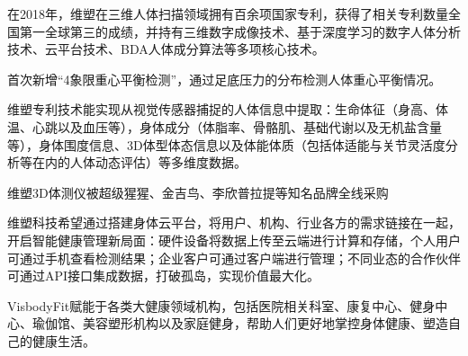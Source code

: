 \documentclass[letterpaper,11pt,english]{sphinxmanual}
\begin{document}
在2018年，维塑在三维人体扫描领域拥有百余项国家专利，获得了相关专利数量全国第一全球第三的成绩，并持有三维数字成像技术、基于深度学习的数字人体分析技术、云平台技术、BDA人体成分算法等多项核心技术。%
\begin{footnote}[691]\sphinxAtStartFootnote
{}
%
\end{footnote}

首次新增“4象限重心平衡检测”，通过足底压力的分布检测人体重心平衡情况。
%
\begin{footnote}[692]\sphinxAtStartFootnote
{}
%
\end{footnote}

维塑专利技术能实现从视觉传感器捕捉的人体信息中提取：生命体征（身高、体温、心跳以及血压等），身体成分（体脂率、骨骼肌、基础代谢以及无机盐含量等），身体围度信息、3D体型体态信息以及体能体质（包括体适能与关节灵活度分析等在内的人体动态评估）等多维度数据。

维塑3D体测仪被超级猩猩、金吉鸟、李欣普拉提等知名品牌全线采购

维塑科技希望通过搭建身体云平台，将用户、机构、行业各方的需求链接在一起，开启智能健康管理新局面：硬件设备将数据上传至云端进行计算和存储，个人用户可通过手机查看检测结果；企业客户可通过客户端进行管理；不同业态的合作伙伴可通过API接口集成数据，打破孤岛，实现价值最大化。%
\begin{footnote}[693]\sphinxAtStartFootnote
{}
%
\end{footnote}

VisbodyFit赋能于各类大健康领域机构，包括医院相关科室、康复中心、健身中心、瑜伽馆、美容塑形机构以及家庭健身，帮助人们更好地掌控身体健康、塑造自己的健康生活。
\end{document}
